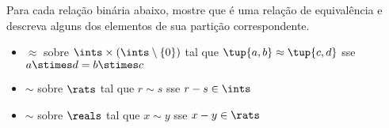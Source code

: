 \begin{exercise}
	Para cada relação binária abaixo, mostre que é uma relação de equivalência e descreva alguns dos elementos de sua partição correspondente.
	\begin{itemize}
		\item $\approx$ sobre $\ints \times (\ints \setminus \{0\})$ tal que $\tup{a, b} \approx \tup{c, d}$ sse $a \stimes d = b \stimes c$
		\item $\sim$ sobre $\rats$ tal que $r \sim s$ sse $r - s \in \ints$
		\item $\sim$ sobre $\reals$ tal que $x \sim y$ sse $x - y \in \rats$
	\end{itemize}
\end{exercise}
